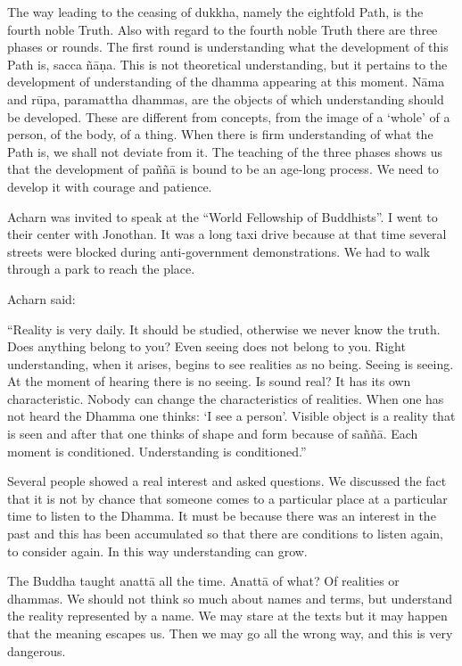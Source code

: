 The way leading to the ceasing of dukkha, namely the eightfold Path, is
the fourth noble Truth. Also with regard to the fourth noble Truth there
are three phases or rounds. The first round is understanding what the
development of this Path is, sacca ñāṇa. This is not theoretical
understanding, but it pertains to the development of understanding of
the dhamma appearing at this moment. Nāma and rūpa, paramattha dhammas,
are the objects of which understanding should be developed. These are
different from concepts, from the image of a `whole' of a person, of the
body, of a thing. When there is firm understanding of what the Path is,
we shall not deviate from it. The teaching of the three phases shows us
that the development of paññā is bound to be an age-long process. We
need to develop it with courage and patience.

Acharn was invited to speak at the ``World Fellowship of Buddhists''. I
went to their center with Jonothan. It was a long taxi drive because at
that time several streets were blocked during anti-government
demonstrations. We had to walk through a park to reach the place.

Acharn said:

``Reality is very daily. It should be studied, otherwise we never know
the truth. Does anything belong to you? Even seeing does not belong to
you. Right understanding, when it arises, begins to see realities as no
being. Seeing is seeing. At the moment of hearing there is no seeing. Is
sound real? It has its own characteristic. Nobody can change the
characteristics of realities. When one has not heard the Dhamma one
thinks: `I see a person'. Visible object is a reality that is seen and
after that one thinks of shape and form because of saññā. Each moment is
conditioned. Understanding is conditioned.''

Several people showed a real interest and asked questions. We discussed
the fact that it is not by chance that someone comes to a particular
place at a particular time to listen to the Dhamma. It must be because
there was an interest in the past and this has been accumulated so that
there are conditions to listen again, to consider again. In this way
understanding can grow.

The Buddha taught anattā all the time. Anattā of what? Of realities or
dhammas. We should not think so much about names and terms, but
understand the reality represented by a name. We may stare at the texts
but it may happen that the meaning escapes us. Then we may go all the
wrong way, and this is very dangerous.

